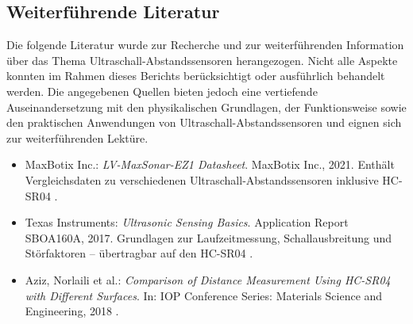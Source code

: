 \subsection{Weiterführende Literatur}
\label{WeiterführendeLiteraturHC04}

Die folgende Literatur wurde zur Recherche und zur weiterführenden Information über das Thema Ultraschall-Abstandssensoren herangezogen. 
Nicht alle Aspekte konnten im Rahmen dieses Berichts berücksichtigt oder ausführlich behandelt werden. 
Die angegebenen Quellen bieten jedoch eine vertiefende Auseinandersetzung mit den physikalischen Grundlagen, 
der Funktionsweise sowie den praktischen Anwendungen von Ultraschall-Abstandssensoren und eignen sich zur weiterführenden Lektüre.


\begin{itemize}
	\item MaxBotix Inc.: \textsl{LV-MaxSonar-EZ1 Datasheet}. MaxBotix Inc., 2021. Enthält Vergleichsdaten zu verschiedenen Ultraschall-Abstandssensoren inklusive HC-SR04 \cite{MaxBotix:2021}.

	\item Texas Instruments: \textsl{Ultrasonic Sensing Basics}. Application Report SBOA160A, 2017. Grundlagen zur Laufzeitmessung, Schallausbreitung und Störfaktoren – übertragbar auf den HC-SR04 \cite{TexasInstruments:2017}.

	\item Aziz, Norlaili et al.: \textsl{Comparison of Distance Measurement Using HC-SR04 with Different Surfaces}. In: IOP Conference Series: Materials Science and Engineering, 2018 \cite{Rihmi:2024}.

\end{itemize}


